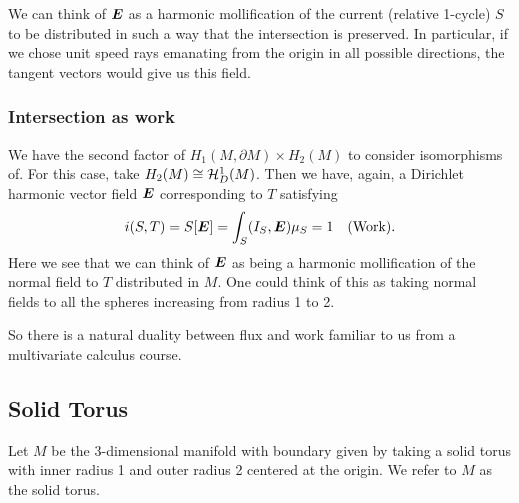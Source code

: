 \documentclass{article}
\begin{document}
We can think of $\boldsymbol{E}$ as a harmonic mollification of the current (relative 1-cycle) $S$ to be distributed in such a way that the intersection is preserved. In particular, if we chose unit speed rays emanating from the origin in all possible directions, the tangent vectors would give us this field.

\subsubsection{Intersection as work}
We have the second factor of $H_1(M,\partial M) \times H_{2}(M)$ to consider isomorphisms of. For this case, take $H_2(M)\cong \mathcal{H}^1_D(M)$. Then we have, again, a Dirichlet harmonic vector field $\boldsymbol{E}$ corresponding to $T$ satisfying
\begin{align*}
i(S,T) = S[\boldsymbol{E}] = \int_S (I_S,\boldsymbol{E}) \mu_S = 1 && \textrm{(Work)}.
\end{align*}
Here we see that we can think of $\boldsymbol{E}$ as being a harmonic mollification of the normal field to $T$ distributed in $M$. One could think of this as taking normal fields to all the spheres increasing from radius 1 to 2.

So there is a natural duality between flux and work familiar to us from a multivariate calculus course.


\subsection{Solid Torus}
Let $M$ be the 3-dimensional manifold with boundary given by taking a solid torus with inner radius 1 and outer radius 2 centered at the origin. We refer to $M$ as the solid torus.
\begin{figure}[H]
	\centering
	
\end{figure}
\end{document}
